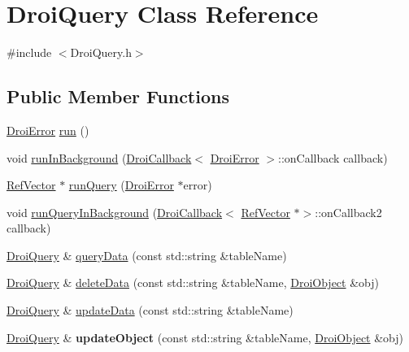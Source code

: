 \hypertarget{class_droi_query}{}\section{Droi\+Query Class Reference}
\label{class_droi_query}


{\ttfamily \#include $<$Droi\+Query.\+h$>$}

\subsection*{Public Member Functions}
\begin{DoxyCompactItemize}
\item 
\hyperlink{class_droi_error}{Droi\+Error} \hyperlink{class_droi_query_ab66d0b568d69f579e4fdf9ac77d6c6b4}{run} ()
\item 
void \hyperlink{class_droi_query_a853e3dc36ab0918847a5279b0989c7ab}{run\+In\+Background} (\hyperlink{struct_droi_callback}{Droi\+Callback}$<$ \hyperlink{class_droi_error}{Droi\+Error} $>$\+::on\+Callback callback)
\item 
\hyperlink{class_ref_vector}{Ref\+Vector} $\ast$ \hyperlink{class_droi_query_ac858282a8efa4e45a7cd06ea2f2c55cb}{run\+Query} (\hyperlink{class_droi_error}{Droi\+Error} $\ast$error)
\item 
void \hyperlink{class_droi_query_a2d0790ef682bcf456773e848c0661fac}{run\+Query\+In\+Background} (\hyperlink{struct_droi_callback}{Droi\+Callback}$<$ \hyperlink{class_ref_vector}{Ref\+Vector} $\ast$$>$\+::on\+Callback2 callback)
\item 
\hyperlink{class_droi_query}{Droi\+Query} \& \hyperlink{class_droi_query_a73a7402ccf8fd761313c38e45890aa25}{query\+Data} (const std\+::string \&table\+Name)
\item 
\hyperlink{class_droi_query}{Droi\+Query} \& \hyperlink{class_droi_query_af7084bfa46a759fd3da97e039c478c75}{delete\+Data} (const std\+::string \&table\+Name, \hyperlink{class_droi_object}{Droi\+Object} \&obj)
\item 
\hyperlink{class_droi_query}{Droi\+Query} \& \hyperlink{class_droi_query_afdc95a33d53f45202117d308a0c41b46}{update\+Data} (const std\+::string \&table\+Name)
\item 
\mbox{\label{class_droi_query_a736c35754ac6eda5c34eace2a6c4ac75}} 
\hyperlink{class_droi_query}{Droi\+Query} \& {\bfseries update\+Object} (const std\+::string \&table\+Name, \hyperlink{class_droi_object}{Droi\+Object} \&obj)
$$
\end{DoxyCompactItemize}
